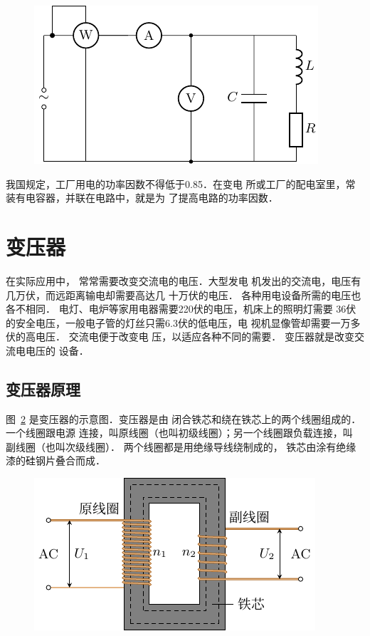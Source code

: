 \begin{figure}[htbp]
	\centering
	\includegraphics{fig/C/3-24.pdf}
	\caption{}\label{fig_C_3-24}
\end{figure}


我国规定，工厂用电的功率因数不得低于0.85．在变电
所或工厂的配电室里，常装有电容器，并联在电路中，就是为
了提高电路的功率因数．

\section{变压器}
在实际应用中，
常常需要改变交流电的电压．大型发电
机发出的交流电，电压有几万伏，而远距离输电却需要高达几
十万伏的电压．
各种用电设备所需的电压也各不相同．
电灯、电炉等家用电器需要220伏的电压，机床上的照明灯需要
36伏的安全电压，一般电子管的灯丝只需6.3伏的低电压，电
视机显像管却需要一万多伏的高电压．
交流电便于改变电
压，以适应各种不同的需要．
变压器就是改变交流电电压的
设备．

\subsection{变压器原理}


图~\ref{fig_C_3-25} 是变压器的示意图．变压器是由
闭合铁芯和绕在铁芯上的两个线圈组成的．一个线圈跟电源
连接，叫原线圈（也叫初级线圈）；另一个线圈跟负载连接，叫
副线圈（也叫次级线圈）．
两个线圈都是用绝缘导线绕制成的，
铁芯由涂有绝缘漆的硅钢片叠合而成．
\begin{figure}[htbp]
	\centering
	\includegraphics{fig/C/3-25.pdf}
	\caption{}\label{fig_C_3-25}
\end{figure}


